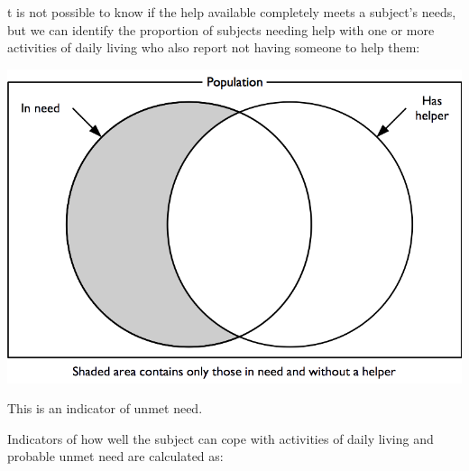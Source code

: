 \documentclass[12pt,a4paper]{book}
\theoremstyle{definition}
\theoremstyle{definition}
\theoremstyle{definition}
\theoremstyle{remark}
\begin{document}
t is not possible to know if the help available completely meets a
subject's needs, but we can identify the proportion of subjects needing
help with one or more activities of daily living who also report not
having someone to help them:

\begin{center}\includegraphics{figures/indicators17} \end{center}

This is an indicator of unmet need.

Indicators of how well the subject can cope with activities of daily
living and probable unmet need are calculated as:
\end{document}
